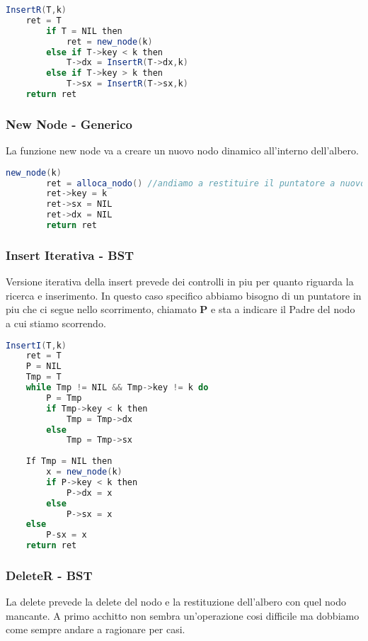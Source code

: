 \begin{lstlisting}[language=Java]
	InsertR(T,k)
	ret = T
		if T = NIL then
			ret = new_node(k)
		else if T->key < k then
			T->dx = InsertR(T->dx,k)
		else if T->key > k then
			T->sx = InsertR(T->sx,k)
	return ret
\end{lstlisting}

\subsubsection{New Node - Generico}
La funzione new node va a creare un nuovo nodo dinamico all'interno dell'albero.

\begin{lstlisting}[language=Java]
	new_node(k)
		ret = alloca_nodo() //andiamo a restituire il puntatore a nuovo nodo allocato in memoria a ret
		ret->key = k
		ret->sx = NIL
		ret->dx = NIL
		return ret
\end{lstlisting}

\subsubsection{Insert Iterativa - BST}
Versione iterativa della insert prevede dei controlli in piu per quanto riguarda la ricerca e inserimento. In questo caso specifico abbiamo bisogno di un puntatore in piu che ci segue nello scorrimento, chiamato \textbf{P} e sta a indicare il Padre del nodo a cui stiamo scorrendo.

\begin{lstlisting}[language=Java]
	InsertI(T,k)
	ret = T
	P = NIL
	Tmp = T
	while Tmp != NIL && Tmp->key != k do
		P = Tmp
		if Tmp->key < k then
			Tmp = Tmp->dx
		else
			Tmp = Tmp->sx
	
	If Tmp = NIL then
		x = new_node(k)
		if P->key < k then
			P->dx = x
		else
			P->sx = x
	else 
		P-sx = x
	return ret
\end{lstlisting}

\subsubsection{DeleteR - BST}
La delete prevede la delete del nodo e la restituzione dell'albero con quel nodo mancante. A primo acchitto non sembra un'operazione cosi difficile ma dobbiamo come sempre andare a ragionare per casi.

